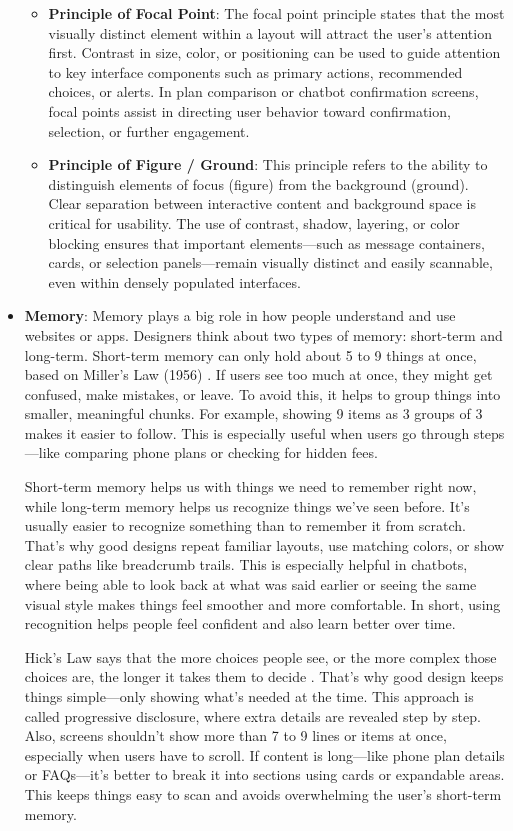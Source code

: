 \documentclass[conference]{IEEEtran}
\begin{document}
\begin{itemize}
\begin{itemize}
        \item \textbf{Principle of Focal Point}: The focal point principle states that the most visually distinct element within a layout will attract the user’s attention first. Contrast in size, color, or positioning can be used to guide attention to key interface components such as primary actions, recommended choices, or alerts. In plan comparison or chatbot confirmation screens, focal points assist in directing user behavior toward confirmation, selection, or further engagement.
        
        \item \textbf{Principle of Figure / Ground}: This principle refers to the ability to distinguish elements of focus (figure) from the background (ground). Clear separation between interactive content and background space is critical for usability. The use of contrast, shadow, layering, or color blocking ensures that important elements—such as message containers, cards, or selection panels—remain visually distinct and easily scannable, even within densely populated interfaces.
    \end{itemize}
    \item \textbf{Memory}:
Memory plays a big role in how people understand and use websites or apps. Designers think about two types of memory: short-term and long-term. Short-term memory can only hold about 5 to 9 things at once, based on Miller’s Law (1956) \cite{Schneider2011AMM}. If users see too much at once, they might get confused, make mistakes, or leave. To avoid this, it helps to group things into smaller, meaningful chunks. For example, showing 9 items as 3 groups of 3 makes it easier to follow. This is especially useful when users go through steps—like comparing phone plans or checking for hidden fees.

Short-term memory helps us with things we need to remember right now, while long-term memory helps us recognize things we've seen before. It’s usually easier to recognize something than to remember it from scratch. That’s why good designs repeat familiar layouts, use matching colors, or show clear paths like breadcrumb trails. This is especially helpful in chatbots, where being able to look back at what was said earlier or seeing the same visual style makes things feel smoother and more comfortable. In short, using recognition helps people feel confident and also learn better over time.

Hick’s Law says that the more choices people see, or the more complex those choices are, the longer it takes them to decide \cite{Schneider2011AMM}. That’s why good design keeps things simple—only showing what’s needed at the time. This approach is called progressive disclosure, where extra details are revealed step by step. Also, screens shouldn’t show more than 7 to 9 lines or items at once, especially when users have to scroll. If content is long—like phone plan details or FAQs—it’s better to break it into sections using cards or expandable areas. This keeps things easy to scan and avoids overwhelming the user’s short-term memory.



\end{itemize}
\end{document}
